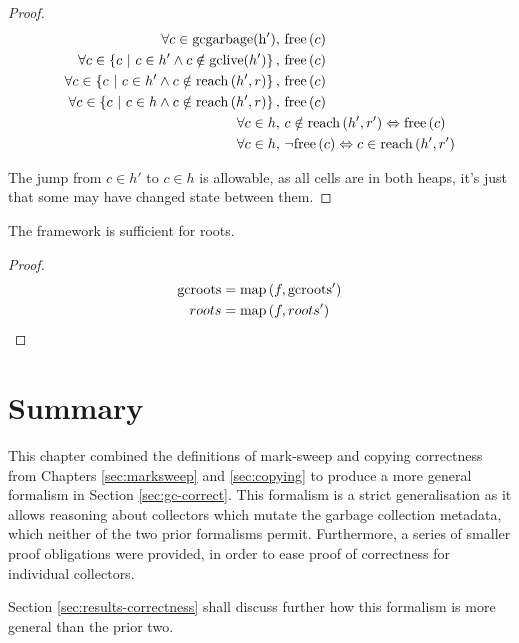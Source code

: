 \begin{proof}
  \begin{align*}
    \forall c \in \mathrm{gcgarbage(h')},\ & \mathrm{free}\left(c\right)\\
    \forall c \in \left\{c~|~c \in h' \land c \notin
      \mathrm{gclive}(h')\right\},\ & \mathrm{free}\left(c\right)\\
    \forall c \in \left\{c~|~c \in h' \land c \notin
      \mathrm{reach}\left(h', r\right)\right\},\ & \mathrm{free}\left(c\right)\\
    \forall c \in \left\{c~|~c \in h \land c \notin
      \mathrm{reach}\left(h', r\right)\right\},\ & \mathrm{free}\left(c\right)\\
    \forall c \in h,\ & c \notin \mathrm{reach}\left(h', r'\right) \Leftrightarrow \mathrm{free}\left(c\right)\\
    \forall c \in h,\ & \lnot\mathrm{free}\left(c\right) \Leftrightarrow c \in \mathrm{reach}\left(h', r'\right)
  \end{align*}

  The jump from $c \in h'$ to $c \in h$ is allowable, as all cells are
  in both heaps, it's just that some may have changed state between
  them.
\end{proof}

\begin{lemma}[Roots]
  The framework is sufficient for roots.
\end{lemma}

\begin{proof}
  \begin{align*}
    \mathrm{gcroots} &= \mathrm{map}\left(f, \mathrm{gcroots'}\right)\\
    roots &= \mathrm{map}\left(f, roots'\right)
  \end{align*}
\end{proof}

\section{Summary}
\label{sec:gc-summary}

This chapter combined the definitions of mark-sweep and copying
correctness from Chapters \ref{sec:marksweep} and \ref{sec:copying} to
produce a more general formalism in Section \ref{sec:gc-correct}. This
formalism is a strict generalisation as it allows reasoning about
collectors which mutate the garbage collection metadata, which neither
of the two prior formalisms permit. Furthermore, a series of smaller
proof obligations were provided, in order to ease proof of correctness
for individual collectors.

Section \ref{sec:results-correctness} shall discuss further how this
formalism is more general than the prior two.
